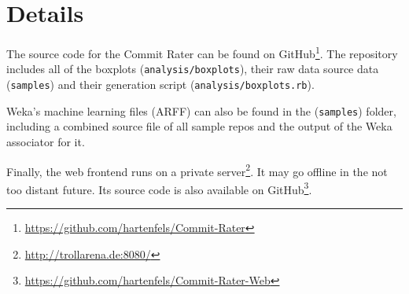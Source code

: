 \section{Details}
\label{sec:details}

The source code for the Commit Rater can be found on GitHub\footnote{\url{https://github.com/hartenfels/Commit-Rater}}. The repository includes all of the boxplots (\texttt{analysis/boxplots}), their raw data source data (\texttt{samples}) and their generation script (\texttt{analysis/boxplots.rb}).

Weka's machine learning files (ARFF) can also be found in the (\texttt{samples}) folder, including a combined source file of all sample repos and the output of the Weka associator for it.

Finally, the web frontend runs on a private server\footnote{\url{http://trollarena.de:8080/}}. It may go offline in the not too distant future. Its source code is also available on GitHub\footnote{\url{https://github.com/hartenfels/Commit-Rater-Web}}.
